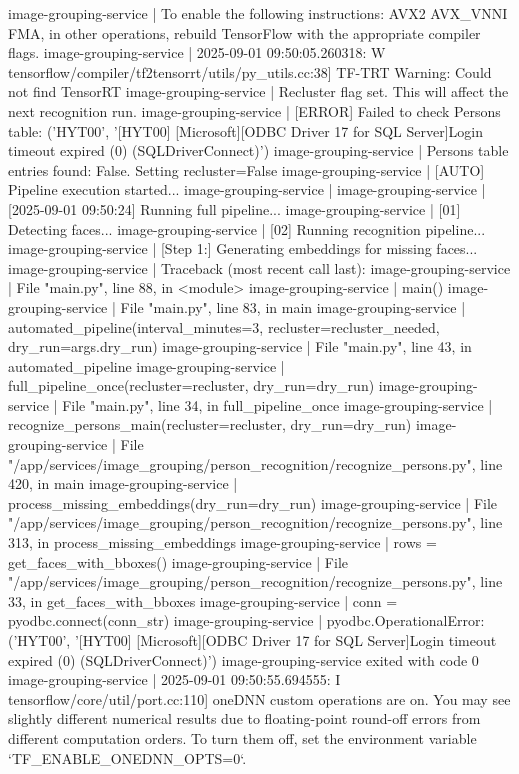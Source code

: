 image-grouping-service  | To enable the following instructions: AVX2 AVX_VNNI FMA, in other operations, rebuild TensorFlow with the appropriate compiler flags.
image-grouping-service  | 2025-09-01 09:50:05.260318: W tensorflow/compiler/tf2tensorrt/utils/py_utils.cc:38] TF-TRT Warning: Could not find TensorRT
image-grouping-service  | Recluster flag set. This will affect the next recognition run.
image-grouping-service  | [ERROR] Failed to check Persons table: ('HYT00', '[HYT00] [Microsoft][ODBC Driver 17 for SQL Server]Login timeout expired (0) (SQLDriverConnect)')
image-grouping-service  | Persons table entries found: False. Setting recluster=False
image-grouping-service  | [AUTO] Pipeline execution started...
image-grouping-service  |
image-grouping-service  | [2025-09-01 09:50:24] Running full pipeline...
image-grouping-service  | [01] Detecting faces...
image-grouping-service  | [02] Running recognition pipeline...
image-grouping-service  | [Step 1:] Generating embeddings for missing faces...
image-grouping-service  | Traceback (most recent call last):
image-grouping-service  |   File "main.py", line 88, in <module>
image-grouping-service  |     main()
image-grouping-service  |   File "main.py", line 83, in main
image-grouping-service  |     automated_pipeline(interval_minutes=3, recluster=recluster_needed, dry_run=args.dry_run)
image-grouping-service  |   File "main.py", line 43, in automated_pipeline
image-grouping-service  |     full_pipeline_once(recluster=recluster, dry_run=dry_run)
image-grouping-service  |   File "main.py", line 34, in full_pipeline_once
image-grouping-service  |     recognize_persons_main(recluster=recluster, dry_run=dry_run)
image-grouping-service  |   File "/app/services/image_grouping/person_recognition/recognize_persons.py", line 420, in main
image-grouping-service  |     process_missing_embeddings(dry_run=dry_run)
image-grouping-service  |   File "/app/services/image_grouping/person_recognition/recognize_persons.py", line 313, in process_missing_embeddings
image-grouping-service  |     rows = get_faces_with_bboxes()
image-grouping-service  |   File "/app/services/image_grouping/person_recognition/recognize_persons.py", line 33, in get_faces_with_bboxes
image-grouping-service  |     conn = pyodbc.connect(conn_str)
image-grouping-service  | pyodbc.OperationalError: ('HYT00', '[HYT00] [Microsoft][ODBC Driver 17 for SQL Server]Login timeout expired (0) (SQLDriverConnect)')
image-grouping-service exited with code 0
image-grouping-service  | 2025-09-01 09:50:55.694555: I tensorflow/core/util/port.cc:110] oneDNN custom operations are on. You may see slightly different numerical results due to floating-point round-off errors from different computation orders. To turn them off, set the environment variable `TF_ENABLE_ONEDNN_OPTS=0`.

